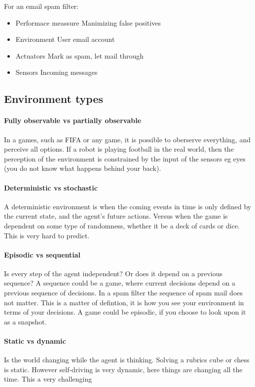 \documentclass{article}
\begin{document}
For an email spam filter:
\begin{itemize}
  \item Performace meassure
    \subitem Manimizing false positives
  \item Environment
    \subitem User email account
  \item Actuators
    \subitem Mark as spam, let mail through
  \item Sensors
    \subitem Incoming messages
\end{itemize}

\subsection{Environment types}%
\label{sub:environment_types}
\paragraph{Fully observable vs partially observable}
In a games, such as FIFA or any game, it is possible to oberserve everything,
and perceive all options.
If a robot is playing football in the real world, then the perception of the
environment is constrained by the input of the sensors eg eyes (you do not know
what happens behind your back).

\paragraph{Deterministic vs stochastic}
A deterministic environment is when the coming events in time is only defined
by the current state, and the agent's future actions. Versus when the game is
dependent on some type of randomness, whether it be a deck of cards or dice.
This is very hard to predict.

\paragraph{Episodic vs sequential}
Is every step of the agent independent? Or does it depend on a previous
sequence? A sequence could be a game, where current decisions depend on a 
previous sequence of decisions. In a spam filter the sequence of spam mail does
not matter.
This is a matter of defintion, it is how you see your environment in terms of
your decisions. A game could be episodic, if you choose to look upon it as a
snapshot.

\paragraph{Static vs dynamic}
Is the world changing while the agent is thinking. Solving a rubrics cube or
chess is static. However self-driving is very dynamic, here things are changing
all the time. This a very challenging 
\end{document}
